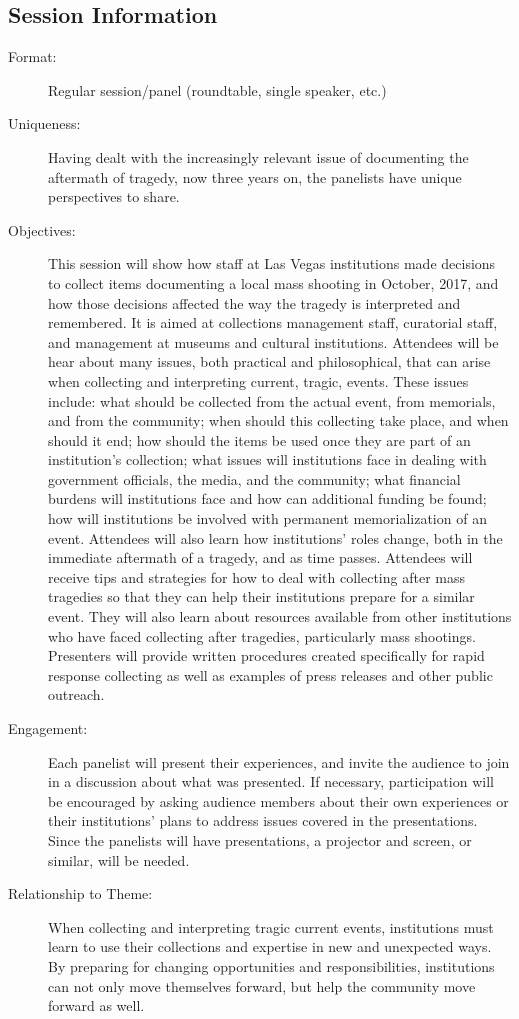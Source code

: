 \documentclass{report}
\begin{document}
              \subsection*{Session Information}
                \begin{description}
                  \item [Format:] Regular session/panel (roundtable, single speaker, etc.)
							    
							    \item [Uniqueness:]Having dealt with the increasingly relevant issue of documenting the aftermath of tragedy, now three years on, the panelists have unique perspectives to share.
							    \item [Objectives:]This session will show how staff at Las Vegas institutions made decisions to collect items documenting a local mass shooting in October, 2017, and how those decisions affected the way the tragedy is interpreted and remembered. It is aimed at collections management staff, curatorial staff, and management at museums and cultural institutions.  Attendees will be hear about many issues, both practical and philosophical, that can arise when collecting and interpreting current, tragic, events. These issues include: what should be collected from the actual event, from memorials, and from the community; when should this collecting take place, and when should it end; how should the items be used once they are part of an institution’s collection; what issues will institutions face in dealing with government officials, the media, and the community; what financial burdens will institutions face and how can additional funding be found; how will institutions be involved with permanent memorialization of an event. Attendees will also learn how institutions’ roles change, both in the immediate aftermath of a tragedy, and as time passes. Attendees will receive tips and strategies for how to deal with collecting after mass tragedies so that they can help their institutions prepare for a similar event. They will also learn about resources available from other institutions who have faced collecting after tragedies, particularly mass shootings. Presenters will provide written procedures created specifically for rapid response collecting as well as examples of press releases and other public outreach.
							    \item [Engagement:]Each panelist will present their experiences, and invite the audience to join in a discussion about what was presented.  If necessary, participation will be encouraged by asking audience members about their own experiences or their institutions’ plans to address issues covered in the presentations.  Since the panelists will have presentations, a projector and screen, or similar, will be needed.
							    \item [Relationship to Theme:]When collecting and interpreting tragic current events, institutions must learn to use their collections and expertise in new and unexpected ways. By preparing for changing opportunities and responsibilities, institutions can not only move themselves forward, but help the community move forward as well.
							    
                \end{description}
\end{document}
